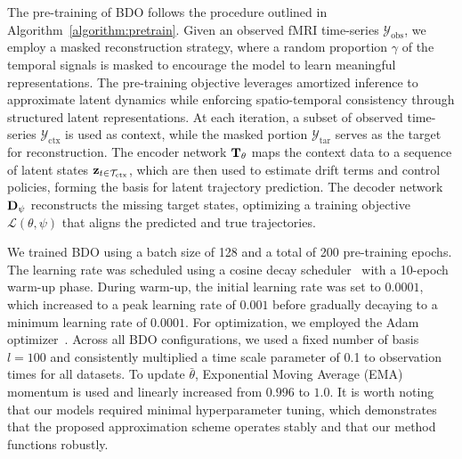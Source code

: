  The pre-training of BDO follows the procedure outlined in Algorithm~\ref{algorithm:pretrain}. Given an observed fMRI time-series $\mathcal{Y}_{\text{obs}}$, we employ a masked reconstruction strategy, where a random proportion $\gamma$ of the temporal signals is masked to encourage the model to learn meaningful representations. The pre-training objective leverages amortized inference to approximate latent dynamics while enforcing spatio-temporal consistency through structured latent representations. At each iteration, a subset of observed time-series $\mathcal{Y}_{\text{ctx}}$ is used as context, while the masked portion $\mathcal{Y}_{\text{tar}}$ serves as the target for reconstruction. The encoder network $\mathbf{T}_{\theta}$ maps the context data to a sequence of latent states $\mathbf{z}_{t \in \mathcal{T}_{\text{ctx}}}$, which are then used to estimate drift terms and control policies, forming the basis for latent trajectory prediction. The decoder network $\mathbf{D}_{\psi}$ reconstructs the missing target states, optimizing a training objective $\mathcal{L}(\theta, \psi)$ that aligns the predicted and true trajectories. 

We trained BDO using a batch size of 128 and a total of 200 pre-training epochs. The learning rate was scheduled using a cosine decay scheduler~\citep{loshchilov2016sgdr} with a 10-epoch warm-up phase. During warm-up, the initial learning rate was set to $0.0001$, which increased to a peak learning rate of $0.001$ before gradually decaying to a minimum learning rate of $0.0001$. For optimization, we employed the Adam optimizer~\citep{diederik2014adam}. Across all BDO configurations, we used a fixed number of basis $l=100$ and consistently multiplied a time scale parameter of 0.1 to observation times for all datasets. To update $\bar{\theta}$, Exponential Moving Average (EMA) momentum is used and linearly increased from $0.996$ to $1.0$. It is worth noting that our models required minimal hyperparameter tuning, which demonstrates that the proposed approximation scheme operates stably and that our method functions robustly.

